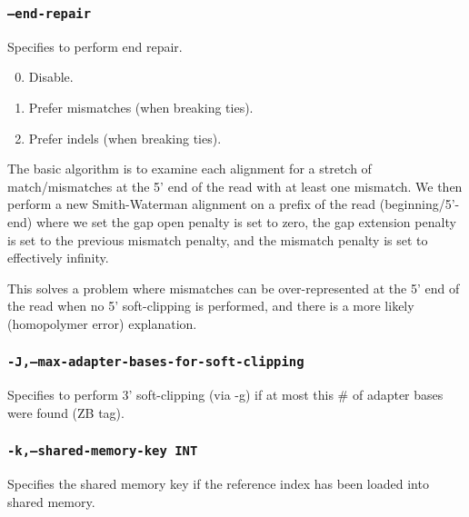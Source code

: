 \documentclass[a4paper,12pt]{book}
\newcommand{\TT}[1]{{\tt #1}} %
\begin{document}
\subsubsection{\TT{--end-repair}}
Specifies to perform end repair.
\begin{enumerate}
	\setcounter{enumi}{-1} %
	\item Disable.
	\item Prefer mismatches (when breaking ties).
	\item Prefer indels (when breaking ties).
\end{enumerate}
The basic algorithm is to examine each alignment for a stretch of match/mismatches at the 5' end of the read with at least one mismatch.
We then perform a new Smith-Waterman alignment on a prefix of the read (beginning/5'-end) where we set the gap open penalty is set to zero, the gap extension penalty is set to the previous mismatch penalty, and the mismatch penalty is set to effectively infinity.

This solves a problem where mismatches can be over-represented at the 5' end of the read when no 5' soft-clipping is performed, and there is a more likely (homopolymer error) explanation.

\subsubsection{\TT{-J,--max-adapter-bases-for-soft-clipping}}
Specifies to perform 3' soft-clipping (via -g) if at most this \# of adapter bases were found (ZB tag).

\subsubsection{\TT{-k,--shared-memory-key INT}}
Specifies the shared memory key if the reference index has been loaded into shared memory.
\end{document}
